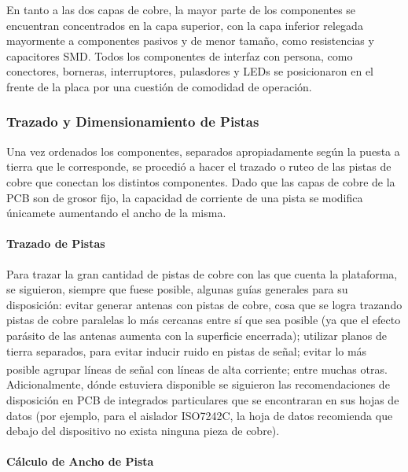 En tanto a las dos capas de cobre, la mayor parte de los componentes se encuentran concentrados en la capa superior, con la capa inferior relegada mayormente a componentes pasivos y de menor tamaño, como resistencias y capacitores SMD. Todos los componentes de interfaz con persona, como conectores, borneras, interruptores, pulasdores y LEDs se posicionaron en el frente de la placa por una cuestión de comodidad de operación.\\

\subsubsection{Trazado y Dimensionamiento de Pistas}

Una vez ordenados los componentes, separados apropiadamente según la puesta a tierra que le corresponde, se procedió a hacer el trazado o ruteo de las pistas de cobre que conectan los distintos componentes. Dado que las capas de cobre de la PCB son de grosor fijo, la capacidad de corriente de una pista se modifica únicamete aumentando el ancho de la misma.\\

\paragraph{Trazado de Pistas}

Para trazar la gran cantidad de pistas de cobre con las que cuenta la plataforma, se siguieron, siempre que fuese posible, algunas guías generales para su disposición: evitar generar antenas con pistas de cobre, cosa que se logra trazando pistas de cobre paralelas lo más cercanas entre sí que sea posible (ya que el efecto parásito de las antenas aumenta con la superficie encerrada); utilizar planos de tierra separados, para evitar inducir ruido en pistas de señal; evitar lo más posible agrupar líneas de señal con líneas de alta corriente; entre muchas otras.\textsuperscript{\cite{PCBLayout}}\\

Adicionalmente, dónde estuviera disponible se siguieron las recomendaciones de disposición en PCB de integrados particulares que se encontraran en sus hojas de datos (por ejemplo, para el aislador ISO7242C, la hoja de datos recomienda que debajo del dispositivo no exista ninguna pieza de cobre).\\

\paragraph{Cálculo de Ancho de Pista}

